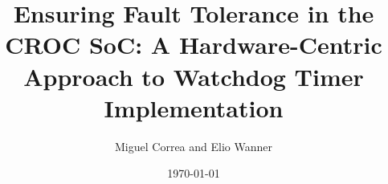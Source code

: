 \documentclass[%
 oneside,      %
 openany,      %
 halfparskip,  %
]{scrbook}
\title{Ensuring Fault Tolerance in the CROC SoC: A Hardware-Centric Approach to Watchdog Timer Implementation}
\author{Miguel Correa and Elio Wanner}
\date{\today}
\begin{document}
\dominitoc

\frontmatter





\tableofcontents



\mainmatter










\appendix

\backmatter



\nocite*{} %
% 
% 
\end{document}
